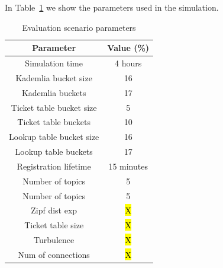 In Table~\ref{tab:param} we show the parameters used in the simulation. 

\begin{table}[!hbt]
\centering
\scriptsize
\begin{tabular}{|c|c|}%
\hline
Parameter     & Value (\%) \\
\hline
\hline
Simulation time & 4 hours \\%
\hline
Kademlia bucket size & 16 \\%
\hline
Kademlia buckets & 17 \\%
\hline
Ticket table bucket size & 5 \\%
\hline
Ticket table buckets & 10 \\%
\hline
Lookup table bucket size & 16 \\%
\hline
Lookup table buckets & 17 \\%
\hline
Registration lifetime & 15 minutes \\%
\hline
Number of topics & 5 \\%
\hline
Number of topics & 5 \\%
\hline
Zipf dist exp & \hl{X} \\%
\hline
Ticket table size & \hl{X} \\
\hline
Turbulence & \hl{X} \\%
\hline
Num of connections & \hl{X} \\%
\hline
\bottomrule
\end{tabular}
\vspace{2mm}
\caption{Evaluation scenario parameters}
\label{tab:param}
\vspace{-0.05in}
\end{table}


